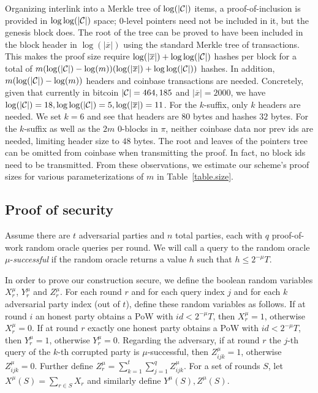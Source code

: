 Organizing interlink into a Merkle tree of $\log(|\mathcal{C}|)$ items, a
proof-of-inclusion is provided in $\log \log(|\mathcal{C}|)$ space; $0$-level
pointers need not be included in it, but the genesis block does. The root of the
tree can be proved to have been included in the block header in $\log(|\overline
x|)$ using the standard Merkle tree of transactions. This makes the proof size
require $\log(|\overline x|) + \log\log(|\mathcal{C}|)$ hashes per block for a total
of $m (\log(|\mathcal{C}|) - \log(m))(\log(|\overline x|) + \log\log(|\mathcal{C}|))$
hashes. In addition, $m (\log(|\mathcal{C}|) - \log(m))$ headers and coinbase
transactions are needed. Concretely, given that currently in bitcoin $|\mathcal{C}| =
464,185$ and $|\overline x| = 2000$, we have $\log(|\mathcal{C}|) = 18,
\log\log(|\mathcal{C}|) = 5, \log(|\overline x|) = 11$. For the $k$-suffix, only $k$
headers are needed. We set $k = 6$ and see that headers are $80$ bytes and
hashes $32$ bytes. For the $k$-suffix as well as the $2m$ $0$-blocks in $\pi$,
neither coinbase data nor prev ids are needed, limiting header size to $48$
bytes. The root and leaves of the pointers tree can be omitted from coinbase when
transmitting the proof. In fact, no block ids need to be transmitted. From these
observations, we estimate our scheme's proof sizes for various parameterizations
of $m$ in Table~\ref{table.size}.

\subsection{Proof of security}
Assume there are $t$ adversarial parties and $n$ total parties, each with $q$
proof-of-work random oracle queries per round. We will call a query to the
random oracle $\mu$-\textit{successful} if the random oracle returns a value $h$
such that $h \leq 2^{-\mu}T$.

In order to prove our construction secure, we define the boolean random
variables $X_r^\mu$, $Y_r^\mu$ and $Z_r^\mu$. For each round $r$ and for each
query index $j$ and for each $k$ adversarial party index (out of $t$), define
these random variables as follows. If at round $i$ an honest party obtains a
PoW with $id < 2^{-\mu}T$, then $X_r^\mu = 1$, otherwise $X_r^\mu = 0$. If at
round $r$ exactly one honest party obtains a PoW with $id < 2^{-\mu}T$, then
$Y_r^\mu = 1$, otherwise $Y_r^\mu = 0$. Regarding the adversary, if at round $r$
the $j$-th query of the $k$-th corrupted party is $\mu$-successful, then
$Z^\mu_{ijk} = 1$, otherwise $Z^\mu_{ijk} = 0$. Further define $Z^\mu_r =
\sum_{k=1}^t \sum_{j=1}^q Z^\mu_{ijk}$. For a set of rounds $S$, let $X^\mu(S) =
\sum_{r \in S} X_r$ and similarly define $Y^\mu(S), Z^\mu(S)$.

